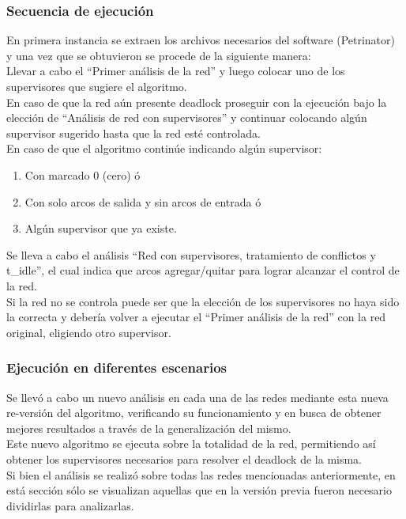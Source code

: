 \subsubsection{Secuencia de ejecución}
En primera instancia se extraen los archivos necesarios del software (Petrinator) y una vez que se obtuvieron se procede de la siguiente manera: \\
Llevar a cabo el “Primer análisis de la red” y luego colocar uno de los supervisores que sugiere el algoritmo.  \\
En caso de que la red aún presente deadlock proseguir con la ejecución bajo la elección de “Análisis de red con supervisores” y continuar colocando algún supervisor sugerido hasta que la red esté controlada. \\


\noindent En caso de que el algoritmo continúe indicando algún supervisor:
\begin{itemize}
    \begin{enumerate}
        \item Con marcado 0 (cero) ó 
        \item Con solo arcos de salida y sin arcos de entrada ó 
        \item Algún supervisor que ya existe.
    \end{enumerate}
\end{itemize}
Se lleva a cabo el análisis “Red con supervisores, tratamiento de conflictos y t\_idle”, el cual indica que arcos agregar/quitar para lograr alcanzar el control de la red. \\
Si la red no se controla puede ser que la elección de los supervisores no haya sido la correcta y debería volver a ejecutar el “Primer análisis de la red” con la red original, eligiendo otro supervisor.
\bigskip

\subsubsection{Ejecución en diferentes escenarios}
Se llevó a cabo un nuevo análisis en cada una de las redes mediante esta nueva re-versión del algoritmo, verificando su funcionamiento y en busca de obtener mejores resultados a través de la generalización del mismo. \\
Este nuevo algoritmo se ejecuta sobre la totalidad de la red, permitiendo así obtener los supervisores necesarios para resolver el deadlock de la misma. \\
Si bien el análisis se realizó sobre todas las redes mencionadas anteriormente, en está sección sólo se visualizan aquellas que en la versión previa fueron necesario dividirlas para analizarlas.
\bigskip

